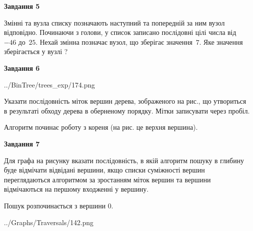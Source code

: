 \documentclass[12pt, ukrainian]{article}
\begin{document}
{\begin {large}
{\begin {center}\textbf{Завдання 5}\end {center}}\par
Змінні  та  вузла списку позначають наступний та попередній за ним вузол відповідно. Починаючи з голови, у список записано послідовні цілі числа від~$-46$ до~$25$. Нехай змінна  позначає вузол, що зберігає значення~$7$.
Яке значення зберігається у вузлі  ?\par
\newpage

{\begin {center}\textbf{Завдання 6}\end {center}}\par

\begin{center}
	{../BinTree/trees_exp/174.png}
\end{center}
Указати послідовність міток вершин дерева, зображеного на рис., що утвориться в результаті обходу дерева в оберненому порядку. Мітки записувати через пробіл.\par Алгоритм починає роботу з кореня (на рис. це верхня вершина).\par
\newpage

{\begin {center}\textbf{Завдання 7}\end {center}}\par
Для графа на рисунку вказати послідовність, в якій алгоритм пошуку в глибину буде відмічати відвідані вершини, якщо списки суміжності вершин переглядаються алгоритмом за зростанням міток вершин та вершини відмічаються на першому вход\-женні у вершину.\par
Пошук розпочинається з вершини 0.\par

\begin{center}
	{../Graphs/Traversals/142.png}
\end{center}\par
\newpage


\end{large}}
\end{document}
